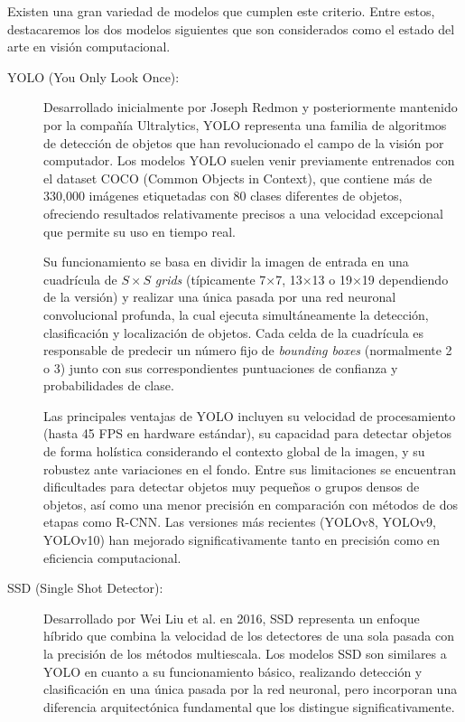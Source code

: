 Existen una gran variedad de modelos que cumplen este criterio. Entre estos, destacaremos los dos modelos siguientes que son considerados como el estado del arte en visión computacional.

\begin{description}
	\item[YOLO (You Only Look Once):] Desarrollado inicialmente por Joseph Redmon y posteriormente mantenido por la compañía Ultralytics, YOLO representa una familia de algoritmos de detección de objetos que han revolucionado el campo de la visión por computador. Los modelos YOLO suelen venir previamente entrenados con el dataset COCO (Common Objects in Context), que contiene más de 330,000 imágenes etiquetadas con 80 clases diferentes de objetos, ofreciendo resultados relativamente precisos a una velocidad excepcional que permite su uso en tiempo real.
	
	Su funcionamiento se basa en dividir la imagen de entrada en una cuadrícula de $S \times S$ \textit{grids} (típicamente 7×7, 13×13 o 19×19 dependiendo de la versión) y realizar una única pasada por una red neuronal convolucional profunda, la cual ejecuta simultáneamente la detección, clasificación y localización de objetos. Cada celda de la cuadrícula es responsable de predecir un número fijo de \textit{bounding boxes} (normalmente 2 o 3) junto con sus correspondientes puntuaciones de confianza y probabilidades de clase.
	
	Las principales ventajas de YOLO incluyen su velocidad de procesamiento (hasta 45 FPS en hardware estándar), su capacidad para detectar objetos de forma holística considerando el contexto global de la imagen, y su robustez ante variaciones en el fondo. Entre sus limitaciones se encuentran dificultades para detectar objetos muy pequeños o grupos densos de objetos, así como una menor precisión en comparación con métodos de dos etapas como R-CNN. Las versiones más recientes (YOLOv8, YOLOv9, YOLOv10) han mejorado significativamente tanto en precisión como en eficiencia computacional.

	\item[SSD (Single Shot Detector):] Desarrollado por Wei Liu et al. en 2016, SSD representa un enfoque híbrido que combina la velocidad de los detectores de una sola pasada con la precisión de los métodos multiescala. Los modelos SSD son similares a YOLO en cuanto a su funcionamiento básico, realizando detección y clasificación en una única pasada por la red neuronal, pero incorporan una diferencia arquitectónica fundamental que los distingue significativamente.
	

\end{description}
